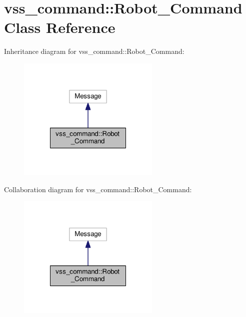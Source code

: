 \hypertarget{classvss__command_1_1Robot__Command}{\section{vss\-\_\-command\-:\-:Robot\-\_\-\-Command Class Reference}
\label{classvss__command_1_1Robot__Command}
}


Inheritance diagram for vss\-\_\-command\-:\-:Robot\-\_\-\-Command\-:
\nopagebreak
\begin{figure}[H]
\begin{center}
\leavevmode
\includegraphics[width=192pt]{classvss__command_1_1Robot__Command__inherit__graph}
\end{center}
\end{figure}


Collaboration diagram for vss\-\_\-command\-:\-:Robot\-\_\-\-Command\-:
\nopagebreak
\begin{figure}[H]
\begin{center}
\leavevmode
\includegraphics[width=192pt]{classvss__command_1_1Robot__Command__coll__graph}
\end{center}
\end{figure}
